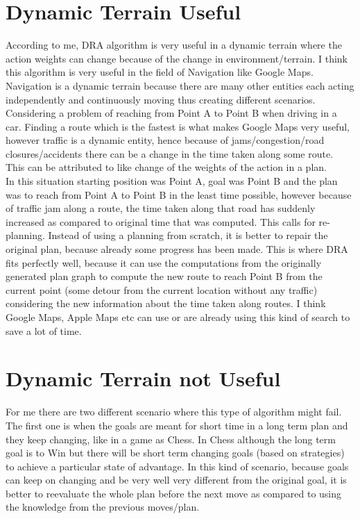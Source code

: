 \documentclass[a4paper]{article}
\begin{document}
\section{Dynamic Terrain Useful}
\label{sec:Q1}

According to me, DRA\text{*} algorithm is very useful in a dynamic terrain where the action weights can change because of the change in environment/terrain. I think this algorithm is very useful in the field of Navigation like Google Maps. Navigation is a dynamic terrain because there are many other entities each acting independently and continuously moving thus creating different scenarios. Considering a problem of reaching from Point A to Point B when driving in a car. Finding a route which is the fastest is what makes Google Maps very useful, however traffic is a dynamic entity, hence because of jams/congestion/road closures/accidents there can be a change in the time taken along some route. This can be attributed to like change of the weights of the action in a plan. 
\\

In this situation starting position was Point A, goal was Point B and the plan was to reach from Point A to Point B in the least time possible, however because of traffic jam along a route, the time taken along that road has suddenly increased as compared to original time that was computed. This calls for re-planning. Instead of using a planning from scratch, it is better to repair the original plan, because already some progress has been made. This is where DRA\text{*} fits perfectly well, because it can use the computations from the originally generated plan graph to compute the new route to reach Point B from the current point (some detour from the current location without any traffic) considering the new information about the time taken along routes. I think Google Maps, Apple Maps etc can use or are already using this kind of search to save a lot of time.
\\

\section{Dynamic Terrain not Useful}
\label{sec:Q2}

For me there are two different scenario where this type of algorithm might fail. 
\\

The first one is when the goals are meant for short time in a long term plan and they keep changing, like in a game as Chess. In Chess although the long term goal is to Win but there will be short term changing goals (based on strategies) to achieve a particular state of advantage. In this kind of scenario, because goals can keep on changing and be very well very different from the original goal, it is better to reevaluate the whole plan before the next move as compared to using the knowledge from the previous moves/plan. \\
\end{document}
